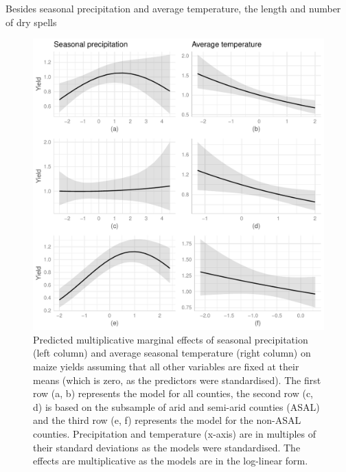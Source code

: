 \documentclass[12pt]{iopart}
\begin{document}
Besides seasonal precipitation and average temperature, the length and number of dry spells  




  \begin{figure}%
   \includegraphics{Figure1a_1f.pdf}
\caption{Predicted multiplicative marginal effects of seasonal precipitation (left column) and average seasonal temperature (right column) on maize yields assuming that all other variables are fixed at their means (which is zero, as the predictors were standardised). The first row (a, b) represents the model for all counties, the second row (c, d) is based on the subsample of arid and semi-arid counties (ASAL) and the third row (e, f) represents the model for the non-ASAL counties. Precipitation and temperature (x-axis) are in multiples of their standard deviations as the models were standardised. The effects are multiplicative as the models are in the log-linear form.}\label{MarEff1}
\end{figure}
\end{document}
